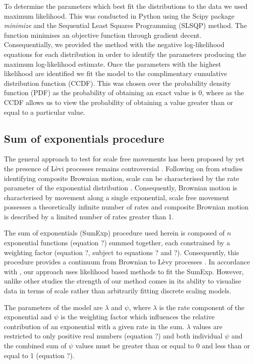 \documentclass[11pt,usenames,dvipsnames,a4paper]{article}
\begin{document}
\begin{linenumbers}
To determine the parameters which best fit the distributions to the data we used maximum likelihood. This was conducted in Python using the Scipy package \textit{minimize} and the Sequential Least Squares Programming (SLSQP) method. The function minimises an objective function through gradient decent. Consequentially, we provided the method with the negative log-likelihood equations for each distribution in order to identify the parameters producing the maximum log-likelihood estimate. Once the parameters with the highest likelihood are identified we fit the model to the complimentary cumulative distribution function (CCDF). This was chosen over the probability density function (PDF) as the probability of obtaining an exact value is 0, where as the CCDF allows us to view the probability of obtaining a value greater than or equal to a particular value. 
\end{linenumbers}

\subsection{Sum of exponentials procedure}

\begin{linenumbers}
\hspace{\parindent}
The general approach to test for scale free movements has been proposed by \cite{Murphy2007} yet the presence of L\`evi processes remains controversial \citep{Pyke2015}. Following on from studies identifying composite Brownian motion, scale can be characterised by the rate parameter of the exponential distribution \citep{Petrovskii2011}. Consequently, Brownian motion is characterised by movement along a single exponential, scale free movement possesses a theoretically infinite number of rates and composite Brownian motion is described by a limited number of rates greater than 1. 

The sum of exponentials (SumExp) procedure used herein is composed of $n$ exponential functions (equation ?) summed together, each constrained by a weighting factor (equation ?, subject to equations ? and ?). Consequently, this procedure provides a continuum from Brownian to L\`evy processes \citep{Jansen2012}. In accordance with \cite{Murphy2007}, our approach uses likelihood based methods to fit the SumExp. However, unlike other studies \citep{Petrovskii2011, Jansen2012, Sakamoto2017, Gautestad2012, Zhao2016} the strength of our method comes in its ability to visualise data in terms of scale rather than arbitrarily fitting discrete scaling models.

The parameters of the model are $\lambda$ and $\psi$, where $\lambda$ is the rate component of the exponential and $\psi$ is the weighting factor which influences the relative contribution of an exponential with a given rate in the sum. $\lambda$ values are restricted to only positive real numbers (equation ?) and both individual $\psi$ and the combined sum of $\psi$ values must be greater than or equal to 0 and less than or equal to 1 (equation ?).
\end{linenumbers}
\end{document}
